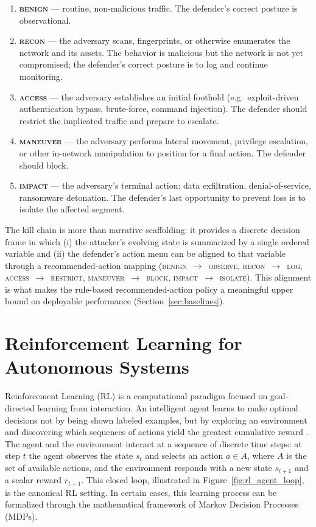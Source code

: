 \begin{enumerate}
    \item \textbf{\textsc{benign}} --- routine, non-malicious traffic. The defender's correct posture is observational.
    \item \textbf{\textsc{recon}} --- the adversary scans, fingerprints, or otherwise enumerates the network and its assets. The behavior is malicious but the network is not yet compromised; the defender's correct posture is to log and continue monitoring.
    \item \textbf{\textsc{access}} --- the adversary establishes an initial foothold (e.g.\ exploit-driven authentication bypass, brute-force, command injection). The defender should restrict the implicated traffic and prepare to escalate.
    \item \textbf{\textsc{maneuver}} --- the adversary performs lateral movement, privilege escalation, or other in-network manipulation to position for a final action. The defender should block.
    \item \textbf{\textsc{impact}} --- the adversary's terminal action: data exfiltration, denial-of-service, ransomware detonation. The defender's last opportunity to prevent loss is to isolate the affected segment.
\end{enumerate}

The kill chain is more than narrative scaffolding: it provides a discrete decision frame in which (i) the attacker's evolving state is summarized by a single ordered variable and (ii) the defender's action menu can be aligned to that variable through a recommended-action mapping (\textsc{benign}~$\to$~\textsc{observe}, \textsc{recon}~$\to$~\textsc{log}, \textsc{access}~$\to$~\textsc{restrict}, \textsc{maneuver}~$\to$~\textsc{block}, \textsc{impact}~$\to$~\textsc{isolate}). This alignment is what makes the rule-based recommended-action policy a meaningful upper bound on deployable performance (Section~\ref{sec:baselines}).

\section{Reinforcement Learning for Autonomous Systems}\label{sec:rl_concepts}
Reinforcement Learning (RL) is a computational paradigm focused on goal-directed learning from interaction. An intelligent agent learns to make optimal decisions not by being shown labeled examples, but by exploring an environment and discovering which sequences of actions yield the greatest cumulative reward \cite{Sutton2018}. The agent and the environment interact at a sequence of discrete time steps: at step $t$ the agent observes the state $s_t$ and selects an action $a \in A$, where $A$ is the set of available actions, and the environment responds with a new state $s_{t+1}$ and a scalar reward $r_{t+1}$. This closed loop, illustrated in Figure~\ref{fig:rl_agent_loop}, is the canonical RL setting. In certain cases, this learning process can be formalized through the mathematical framework of Markov Decision Processes (MDPs).

